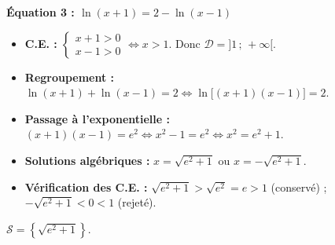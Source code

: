 \documentclass[11pt]{article}
\begin{document}
\begin{exoresolu}
\textbf{Équation 3 : $\ln(x+1) = 2 - \ln(x-1)$}
\begin{itemize}
    \item \textbf{C.E. :} $\begin{cases} x+1 > 0 \\ x-1 > 0 \end{cases} \iff x > 1$. Donc $\mathcal{D} = ]1\,;\, +\infty[$.
    \item \textbf{Regroupement :} $\ln(x+1) + \ln(x-1) = 2 \iff \ln\big[(x+1)(x-1)\big] = 2$.
    \item \textbf{Passage à l'exponentielle :} $(x+1)(x-1) = e^2 \iff x^2 - 1 = e^2 \iff x^2 = e^2 + 1$.
    \item \textbf{Solutions algébriques :} $x = \sqrt{e^2+1}$ ou $x = -\sqrt{e^2+1}$.
    \item \textbf{Vérification des C.E. :} $\sqrt{e^2+1} > \sqrt{e^2} = e > 1$ (conservé) ; $-\sqrt{e^2+1} < 0 < 1$ (rejeté).
\end{itemize}
$\mathcal{S} = \left\{ \sqrt{e^2+1} \right\}$.
\end{exoresolu}
\end{document}
